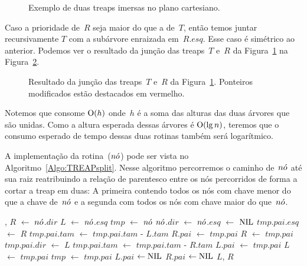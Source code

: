 \begin{figure}[htb]
\centering

\caption{Exemplo de duas treaps imersas no plano cartesiano.}
\label{fig:treap-join}
\end{figure}


Caso a prioridade de~$R$ seja maior do que a de~$T$, então temos juntar recursivamente $T$ com a subárvore enraizada em~$R$.$esq$. Esse caso é simétrico ao anterior.
Podemos ver o resultado da junção das treaps~$T$ e~$R$ da Figura~\ref{fig:treap-join} na Figura~\ref{fig:treap-join-depois}.




\begin{figure}[htb]
\centering

\caption{Resultado da junção das treaps~$T$ e~$R$ da Figura~\ref{fig:treap-join}. Ponteiros modificados estão destacados em vermelho.}
\label{fig:treap-join-depois}
\end{figure}
Notemos que \treapJoin{} consome $\mathrm{O}(h)$ onde~$h$ é a soma das alturas das duas árvores que são unidas.
Como a altura esperada dessas árvores é $\mathrm{O}(\lg n)$, teremos que o consumo esperado de tempo dessas duas rotinas também será logarítmico.


A implementação da rotina~\treapSplit($\node$) pode ser vista no Algoritmo~\ref{Algo:TREAPsplit}.
Nesse algoritmo percorremos o caminho de~$\node$ até sua raiz reatribuindo a relação de parentesco entre os nós percorridos de forma a cortar a treap em duas:
A primeira contendo todos os nós com chave menor do que a chave de~$\node$ e a segunda com todos os nós com chave maior do que~$\node$.


\begin{algorithm}
\caption{\treapSplit($\node$)}
\label{Algo:TREAPsplit}
\begin{algorithmic}[1]
\If { $\node$ $=$ \Nil} \Return \Nil, \Nil
\EndIf
\State $R$ $\gets $ $\node$.$dir$
\State $L$ $\gets $ $\node$.$esq$
\State $tmp$ $\gets$ $\node$
\State $\node$.$dir$ $\gets $ $\node$.$esq$ $\gets $ $\text{NIL}$
    \State $tmp$.$pai$.$esq$ $\gets$ $R$
    \State $tmp$.$pai$.$tam$ $\gets$ $tmp$.$pai$.$tam$ - $L$.$tam$
    \EndIf
    \State $R$.$pai$ $\gets$ $tmp$.$pai$
    \EndIf
    \State $R$ $\gets$ $tmp$.$pai$
  \Else
    \State $tmp$.$pai$.$dir$ $\gets$ $L$ 
    \State $tmp$.$pai$.$tam$ $\gets$ $tmp$.$pai$.$tam$ - $R$.$tam$
    \EndIf
    \State $L$.$pai$ $\gets$ $tmp$.$pai$
    \EndIf
    \State $L$ $\gets$ $tmp$.$pai$
  \EndIf
  \State $tmp$ $\gets$ $tmp$.$pai$
\EndWhile
{} $L$.$pai$ $\gets\text{NIL}$\EndIf
{} $R$.$pai$ $\gets\text{NIL}$\EndIf
\State\Return $L$, $R$
\end{algorithmic}
\end{algorithm}

